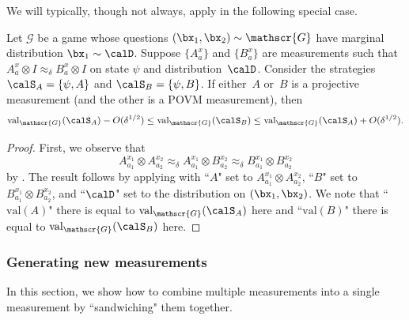 \documentclass[11pt]{article}
\newcommand{\game}{\mathscr{G}}
\newcommand{\valstrat}[2]{\mathrm{val}_{#1}(#2)}
\begin{document}
We will typically, though not always,
apply  in the following special case.

\begin{fact}\label{fact:approx-delta-game-value}
Let $\game$ be a game whose questions $(\bx_1, \bx_2) \sim \game$ have marginal distribution $\bx_1 \sim \calD$.
Suppose $\{A_a^x\}$
and $\{B_a^x\}$ are measurements such that
$
A_a^x  \otimes I \approx_\delta B_a^x \otimes I
$
on state $\psi$ and distribution~$\calD$.
Consider the strategies $\calS_A = \{\psi, A\}$ and $\calS_B = \{\psi, B\}$.
If either~$A$ or~$B$ is a projective measurement (and the other is a POVM measurement), then
\begin{equation*}
\valstrat{\game}{\calS_A} - O(\delta^{1/2}) \leq \valstrat{\game}{\calS_B} \leq \valstrat{\game}{\calS_A} + O(\delta^{1/2}).
\end{equation*}
\end{fact}
\begin{proof}
First, we observe that
\begin{equation*}
A^{x_1}_{a_1} \otimes A^{x_2}_{a_2}
\approx_{\delta} A^{x_1}_{a_1} \otimes B^{x_2}_{a_2}
\approx_{\delta} B^{x_1}_{a_1} \otimes B^{x_2}_{a_2}
\end{equation*}
by .
The result follows by applying  with
``$A$" set to $A^{x_1}_{a_1} \otimes A^{x_2}_{a_2}$,
``$B$" set to $B^{x_1}_{a_1} \otimes B^{x_2}_{a_2}$,
and ``$\calD$" set to the distribution on $(\bx_1, \bx_2)$.
We note that ``$\mathrm{val}(A)$" there is equal to $\valstrat{\game}{\calS_A}$ here and
``$\mathrm{val}(B)$" there is equal to $\valstrat{\game}{\calS_B}$ here.
\end{proof}

\subsubsection{Generating new measurements}

In this section, we show how to combine multiple measurements into a single measurement by ``sandwiching" them together.
\end{document}

